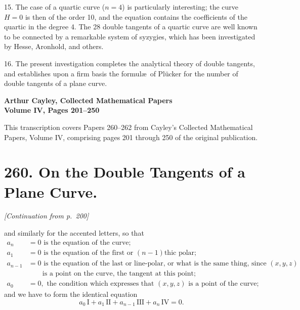 \documentclass[11pt,a4paper]{book}
\begin{document}
15. The case of a quartic curve ($n=4$) is particularly interesting; the curve $H=0$ is then of the order 10, and the equation contains the coefficients of the quartic in the degree 4. The 28 double tangents of a quartic curve are well known to be connected by a remarkable system of syzygies, which has been investigated by Hesse, Aronhold, and others.

16. The present investigation completes the analytical theory of double tangents, and establishes upon a firm basis the formul\ae\ of Pl\"{u}cker for the number of double tangents of a plane curve.
\clearpage


\begin{center}
\Large\textbf{Arthur Cayley, Collected Mathematical Papers}\\[6pt]
\large\textbf{Volume IV, Pages 201--250}
\end{center}

\vspace{1em}
\noindent
This transcription covers Papers 260--262 from Cayley's Collected Mathematical Papers,
Volume IV, comprising pages 201 through 250 of the original publication.

\vspace{2em}


\newpage
\section*{260. On the Double Tangents of a Plane Curve.}
\label{sec:paper260}


\medskip

\noindent\textit{[Continuation from p.~200]}

\medskip

and  similarly  for  the  accented  letters,  so  that 
\begin{align*}
a_n     &=  0  \text{  is  the  equation   of  the  curve} ; \\
a_1     &=  0  \text{  is  the  equation  of  the  first  or  $(n-1)$thic  polar} ; \\
a_{n-1} &=  0  \text{  is  the  equation  of  the  last  or  line-polar,  or  what  is  the  same  thing,  since  $(x, y, z)$} \\
        &\qquad\text{is  a  point   on  the  curve,  the  tangent  at  this  point} ; \\
a_0     &=  0, \text{  the  condition  which  expresses  that  $(x, y, z)$  is  a  point  of  the  curve} ;
\end{align*}
and  we  have  to  form  the  identical  equation
\[
a_0 \, \mathrm{I} + a_1 \, \mathrm{II} + a_{n-1} \, \mathrm{III} + a_n \, \mathrm{IV} = 0.
\]
\end{document}
